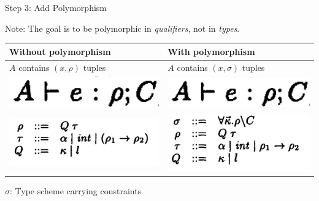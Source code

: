 \documentclass{beamer}
\begin{document}
\begin{frame}{Step 3: Add Polymorphism}

Note: The goal is to be polymorphic in \emph{qualifiers}, not in \emph{types}.

\bigskip

\begin{tabular}{l | l}
Without polymorphism & With polymorphism \\
\hline
$A$ contains $(x, \rho)$ tuples & $A$ contains $(x, \sigma)$ tuples\\
\hline
\includegraphics[scale=0.55]{paper_constraint_judgment_qualifs.png} & \includegraphics[scale=0.55]{paper_constraint_judgment_qualifs.png}\\
\hline  
\includegraphics[scale=0.55]{paper_figure_3_no_label.png} & \includegraphics[scale=0.55]{paper_poly_types_grammar.png} \\
\hline
\end{tabular}

\bigskip

$\sigma$: Type scheme carrying constraints

\end{frame}
\end{document}
